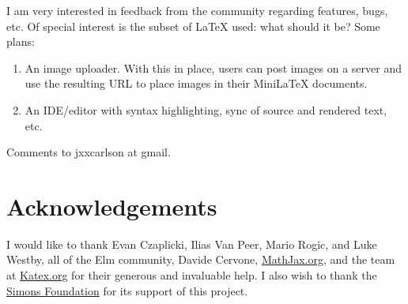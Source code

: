 I am very interested in feedback from the community regarding features, bugs, etc.  Of special interest is the subset of LaTeX used: what should it be? Some plans:

\begin{enumerate}

\item An image uploader.  With this in place, users can post images on a server and use the resulting URL to place images in their MiniLaTeX documents. 

\item An IDE/editor with syntax highlighting, sync of source and rendered text,  etc.



\end{enumerate}

Comments to jxxcarlson at gmail.

\section{Acknowledgements}

I would like to thank Evan Czaplicki, Ilias Van Peer, Mario Rogic, and Luke Westby, all of the Elm community, Davide Cervone, \href{https://mathjax.org}{MathJax.org}, and the team at \href{https://katex.org}{Katex.org} for their generous and invaluable help.   I also wish to thank the \href{https://simonsfoundation.org}{Simons Foundation} for its support of this project.




